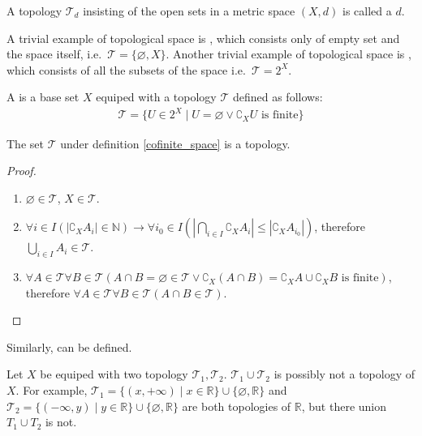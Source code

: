 \documentclass[openany]{book}
\begin{document}
\begin{definition}\label{induced_topology}
A topology $\mathscr{T}_d$ insisting of the open sets in a metric space $( X, d)$ is called a  $d$.
\end{definition}

A trivial example of topological space is , which consists only of empty set and the space itself, i.e.\ $\mathscr{T}=\{\varnothing, X\}$. Another trivial example of topological space is , which consists of all the subsets of the space i.e.\ $\mathscr{T} = 2^X$.

A  is a base set $X$ equiped with a topology $\mathscr{T}$ defined as follows:
\begin{align}\label{cofinite_space}
	\mathscr{T} = \{ U\in 2^X\mid U=\varnothing \vee \complement_X U \text{ is finite} \}
\end{align}
\begin{proposition}
The set $\mathscr{T}$ under definition \ref{cofinite_space} is a topology.
\end{proposition}
\begin{proof}
\begin{enumerate}[label=\alph*)]
\item $\varnothing \in \mathscr{T}$, $X\in\mathscr T$.
\item $\forall i \in I \left(
	\left|\complement_X  A_i\right| \in \mathbb N\right) \to
		\forall i_0\in I\left(
			\left| \bigcap_{i\in I} \complement_X A_i\right| \leq 
				\left|\complement_X A_{i_0}\right|\right)$, therefore $\bigcup_{i\in I}  A_i \in \mathscr T$.
\item $\forall A\in \mathscr T \forall B \in \mathscr T(
	A\cap B=\varnothing\in \mathscr{T} \vee
		\complement_X (A\cap B) = \complement_X A\cup \complement_X B \text{ is finite} )$, 
	therefore $\forall A\in \mathscr T \forall B \in \mathscr T(
		A\cap B \in \mathscr T)$.
\end{enumerate}
\end{proof}

Similarly,  can be defined.

Let $X$ be equiped with two topology $\mathscr T_1, \mathscr T_2$. $\mathscr T_1\cup \mathscr T_2$ is possibly not a topology of $X$. For example, $\mathscr T _1 = \{ (x,+\infty) \mid x\in\mathbb R\}\cup\{ \varnothing,\mathbb R\}$ and $\mathscr T_2 = \{ (-\infty, y) \mid y\in\mathbb R\}\cup\{ \varnothing,\mathbb R\}$ are both topologies of $\mathbb R$, but there union $T_1\cup T_2$ is not. 
\end{document}
